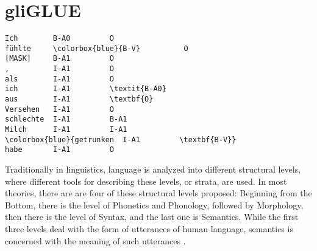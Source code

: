 \label{chap:5_dataset}

\section{gliGLUE}


\begin{Verbatim}[commandchars=\\\{\}]
Ich        B-A0         O
fühlte     \colorbox{blue}{B-V}          O
[MASK]     B-A1         O
,          I-A1         O
als        I-A1         O
ich        I-A1         \textit{B-A0}
aus        I-A1         \textbf{O}
Versehen   I-A1         O
schlechte  I-A1         B-A1
Milch      I-A1         I-A1
\colorbox{blue}{getrunken  I-A1         \textbf{B-V}}
habe       I-A1         O
\end{Verbatim}


Traditionally in linguistics, language is analyzed into different structural levels, where
different tools for describing these levels, or strata, are used.
In most theories, there are are four of these structural levels proposed:
Beginning from the Bottom, there is the level of Phonetics and Phonology, followed by Morphology,
then there is the level of Syntax, and the last one is Semantics.
While the first three levels deal with the form of utterances of human language, semantics is
concerned with the meaning of such utterances \citep[p.~4ff.]{kracht2007introduction}.




